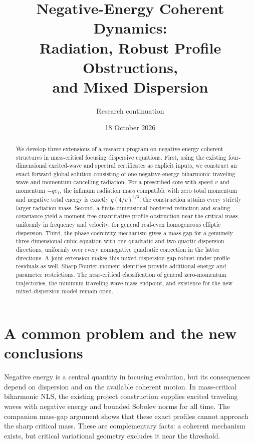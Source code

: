 \documentclass[11pt]{article}
\title{\bfseries Negative-Energy Coherent Dynamics:\\
Radiation, Robust Profile Obstructions,\\and Mixed Dispersion}
\author{Research continuation}
\date{18 October 2026}
\theoremstyle{definition}
\theoremstyle{remark}
\begin{document}
\maketitle
\begin{abstract}
We develop three extensions of a research program on negative-energy coherent structures in mass-critical focusing dispersive equations. First, using the existing four-dimensional excited-wave and spectral certificates as explicit inputs, we construct an exact forward-global solution consisting of one negative-energy biharmonic traveling wave and momentum-cancelling radiation. For a prescribed core with speed $v$ and momentum $-q e_1$, the infimum radiation mass compatible with zero total momentum and negative total energy is exactly $q(4/v)^{1/3}$; the construction attains every strictly larger radiation mass. Second, a finite-dimensional bordered reduction and scaling covariance yield a moment-free quantitative profile obstruction near the critical mass, uniformly in frequency and velocity, for general real-even homogeneous elliptic dispersion. Third, the phase-coercivity mechanism gives a mass gap for a genuinely three-dimensional cubic equation with one quadratic and two quartic dispersion directions, uniformly over every nonnegative quadratic correction in the latter directions. A joint extension makes this mixed-dispersion gap robust under profile residuals as well. Sharp Fourier-moment identities provide additional energy and parameter restrictions. The near-critical classification of general zero-momentum trajectories, the minimum traveling-wave mass endpoint, and existence for the new mixed-dispersion model remain open.
\end{abstract}

\section{A common problem and the new conclusions}

Negative energy is a central quantity in focusing evolution, but its consequences depend on dispersion and on the available coherent motion. In mass-critical biharmonic NLS, the existing project construction supplies excited traveling waves with negative energy and bounded Sobolev norms for all time. The companion mass-gap argument shows that these exact profiles cannot approach the sharp critical mass. These are complementary facts: a coherent mechanism exists, but critical variational geometry excludes it near the threshold.
\end{document}
